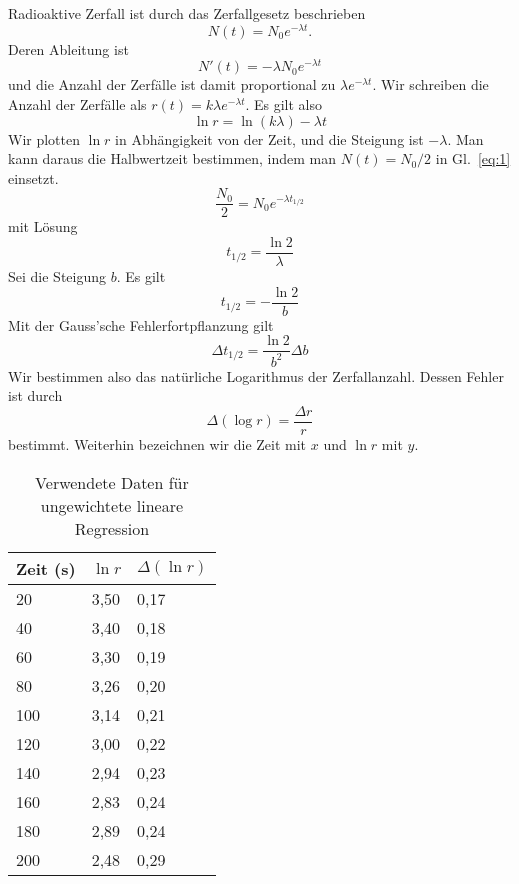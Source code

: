 \documentclass[prb,12pt]{revtex4-2}
\theoremstyle{definition}
\theoremstyle{definition}
\begin{document}
Radioaktive Zerfall ist durch das Zerfallgesetz beschrieben
\begin{equation}\label{eq:1}
	N(t)=N_0e^{-\lambda t}.
\end{equation}
Deren Ableitung ist
\[N'(t)=-\lambda N_0e^{-\lambda t}\]
und die Anzahl der Zerfälle ist damit proportional zu $\lambda e^{-\lambda t}$. Wir schreiben die Anzahl der Zerfälle als $r(t)=k\lambda e^{-\lambda t}$. Es gilt also
\begin{equation}\label{eq:2}
\ln r = \ln (k\lambda) -\lambda t
\end{equation}
Wir plotten $\ln r$ in Abhängigkeit von der Zeit, und die Steigung ist $-\lambda$. Man kann daraus die Halbwertzeit bestimmen, indem man $N(t) = N_0/2$ in Gl.~\eqref{eq:1} einsetzt.
\[
	\frac{N_0}{2} = N_0e^{-\lambda t_{1/2}}
\]
mit Lösung
\begin{equation}
	t_{1/2}=\frac{\ln 2}{\lambda}
\end{equation}
Sei die Steigung $b$. Es gilt
\begin{equation}\label{eq:halflife}
	t_{1/2}=-\frac{\ln 2}{b}
\end{equation}
Mit der Gauss'sche Fehlerfortpflanzung gilt
\begin{equation}\label{eq:error}
	\Delta t_{1/2} = \frac{\ln 2}{b^2}\Delta b
\end{equation}
Wir bestimmen also das natürliche Logarithmus der Zerfallanzahl. Dessen Fehler ist durch
\[\Delta(\log r)= \frac{\Delta r}{r}\]
bestimmt. Weiterhin bezeichnen wir die Zeit mit $x$ und $\ln r$ mit $y$.
\begin{table}[h]
\begin{center}
	\begin{tabular}{p{2cm}p{2cm}p{2cm}}
		\toprule
\textbf{Zeit (s)} & $\ln r$ & $\Delta(\ln r)$\\\midrule
 20 & 3,50 & 0,17 \\\midrule
40 & 3,40 & 0,18 \\\midrule
60 & 3,30 & 0,19 \\\midrule
80 & 3,26 & 0,20 \\\midrule
100 & 3,14 & 0,21 \\\midrule
120 & 3,00 & 0,22 \\\midrule
140 & 2,94 & 0,23 \\\midrule
160 & 2,83 & 0,24 \\\midrule
180 & 2,89 & 0,24 \\\midrule
200 & 2,48 & 0,29 \\\bottomrule
	\end{tabular}
\end{center}
\caption{Verwendete Daten für ungewichtete lineare Regression}
\label{tab:2}
\end{table}
\end{document}
